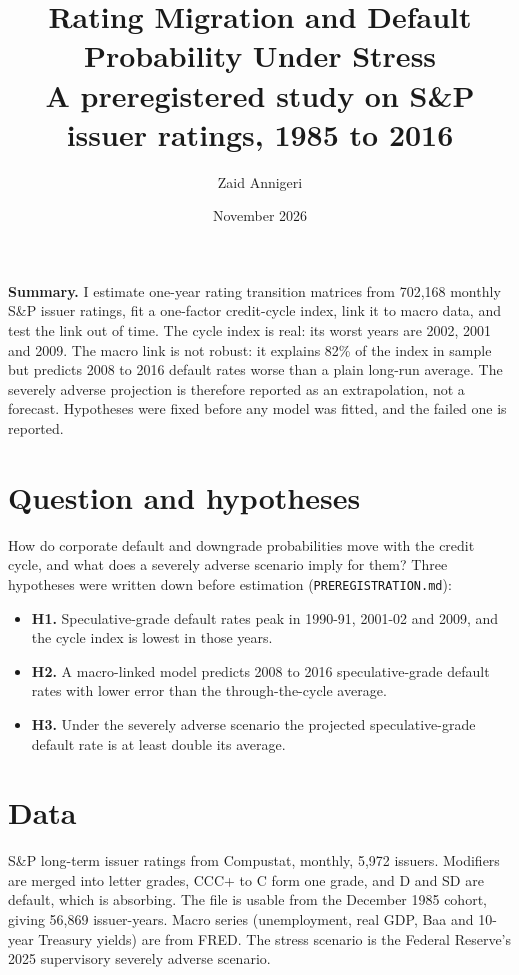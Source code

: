\documentclass[11pt]{article}
\title{\vspace{-1.2cm}\textbf{Rating Migration and Default Probability Under Stress}\\ \large A preregistered study on S\&P issuer ratings, 1985 to 2016}
\author{Zaid Annigeri}
\date{November 2026}
\begin{document}
\maketitle

\begin{infobox}
\textbf{Summary.} I estimate one-year rating transition matrices from 702,168 monthly S\&P issuer ratings, fit a one-factor credit-cycle index, link it to macro data, and test the link out of time. The cycle index is real: its worst years are 2002, 2001 and 2009. The macro link is not robust: it explains 82\% of the index in sample but predicts 2008 to 2016 default rates worse than a plain long-run average. The severely adverse projection is therefore reported as an extrapolation, not a forecast. Hypotheses were fixed before any model was fitted, and the failed one is reported.
\end{infobox}

\section{Question and hypotheses}

How do corporate default and downgrade probabilities move with the credit cycle, and what does a severely adverse scenario imply for them? Three hypotheses were written down before estimation (\texttt{PREREGISTRATION.md}):

\begin{itemize}
\item \textbf{H1.} Speculative-grade default rates peak in 1990-91, 2001-02 and 2009, and the cycle index is lowest in those years.
\item \textbf{H2.} A macro-linked model predicts 2008 to 2016 speculative-grade default rates with lower error than the through-the-cycle average.
\item \textbf{H3.} Under the severely adverse scenario the projected speculative-grade default rate is at least double its average.
\end{itemize}

\section{Data}

S\&P long-term issuer ratings from Compustat, monthly, 5,972 issuers. Modifiers are merged into letter grades, CCC+ to C form one grade, and D and SD are default, which is absorbing. The file is usable from the December 1985 cohort, giving 56,869 issuer-years. Macro series (unemployment, real GDP, Baa and 10-year Treasury yields) are from FRED. The stress scenario is the Federal Reserve's 2025 supervisory severely adverse scenario.
\end{document}
